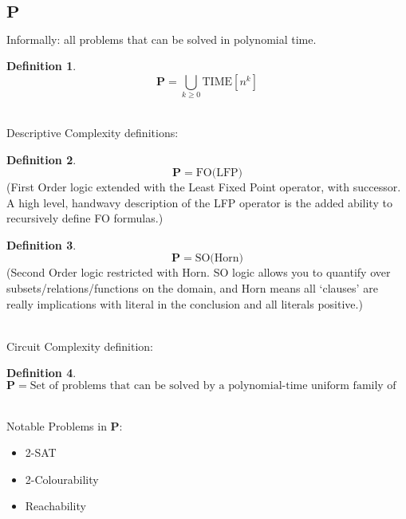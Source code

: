 \documentclass[]{article}
\theoremstyle{definition}
\newtheorem{definition}{Definition}[section]
\begin{document}
\subsection{$\mathbf{P}$}
\label{sec:P}
Informally: all problems that can be solved in polynomial time.
\begin{definition}
	$$\mathbf{P} = \bigcup_{k\geq 0} \hyperref[sec:TIME]{\text{TIME}}[n^{k}]$$
\end{definition}
$ $
\\
\\
Descriptive Complexity definitions: 
\begin{definition}
	$$\mathbf{P} = \text{FO(LFP)}$$
(First Order logic extended with the Least Fixed Point operator, with successor. A high level, handwavy description of the LFP operator is the added ability to recursively define FO formulas.)
\end{definition}
\begin{definition}
	$$\mathbf{P} = \text{SO(Horn)}$$
(Second Order logic restricted with Horn. SO logic allows you to quantify over subsets/relations/functions on the domain, and Horn means all `clauses' are really implications with literal in the conclusion and all literals positive.)
\end{definition}
$ $
\\
\\
Circuit Complexity definition:
\begin{definition}
	$$\mathbf{P} = \text{Set of problems that can be solved by a polynomial-time uniform family of boolean circuits}$$
\end{definition}
$ $
\\
\\
Notable Problems in $\mathbf{P}$:
\begin{itemize}
	\item 2-SAT
	\item 2-Colourability
	\item Reachability
\end{itemize}
\end{document}
